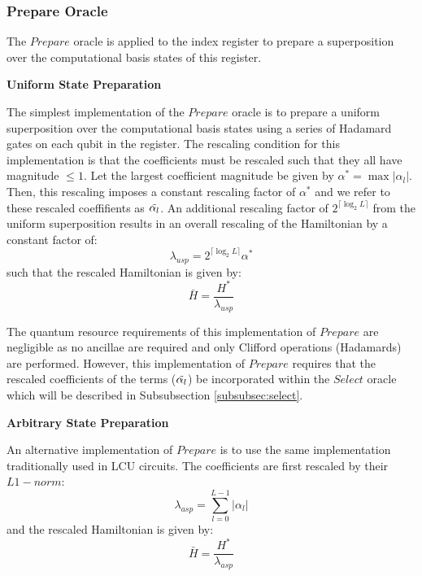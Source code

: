 \subsubsection{Prepare Oracle}
The $\textit{Prepare}$ oracle is applied to the index register to prepare a superposition over the computational basis states of this register.

\textbf{Uniform State Preparation}

The simplest implementation of the $\textit{Prepare}$ oracle is to prepare a uniform superposition over the computational basis states using a series of Hadamard gates on each qubit in the register.
The rescaling condition for this implementation is that the coefficients must be rescaled such that they all have magnitude $\leq 1$.
Let the largest coefficient magnitude be given by $\alpha^* = \max{|\alpha_l|}$.
Then, this rescaling imposes a constant rescaling factor of $\alpha^*$ and we refer to these rescaled coeffifients as $\Tilde{\alpha_l}$.
An additional rescaling factor of $2^{\lceil \log_2{L} \rceil}$ from the uniform superposition results in an overall rescaling of the Hamiltonian by a constant factor of:
\begin{equation}
    \lambda_{usp} = 2^{\lceil \log_2{L} \rceil} \alpha^*
\end{equation}
such that the rescaled Hamiltonian is given by:
\begin{equation}
    \bar{H} = \frac{H^*}{\lambda_{usp}}
\end{equation}

The quantum resource requirements of this implementation of $\textit{Prepare}$ are negligible as no ancillae are required and only Clifford operations (Hadamards) are performed.
However, this implementation of $\textit{Prepare}$ requires that the rescaled coefficients of the terms ($\Tilde{\alpha_l}$) be incorporated within the $\textit{Select}$ oracle which will be described in Subsubsection \ref{subsubsec:select}.

\textbf{Arbitrary State Preparation}

An alternative implementation of $\textit{Prepare}$ is to use the same implementation traditionally used in LCU circuits.
The coefficients are first rescaled by their $L1-norm$:
\begin{equation}
    \lambda_{asp} = \sum_{l=0}^{L-1} |\alpha_l|
\end{equation}
and the rescaled Hamiltonian is given by:
\begin{equation}
    \bar{H} = \frac{H^*}{\lambda_{asp}}
\end{equation}

